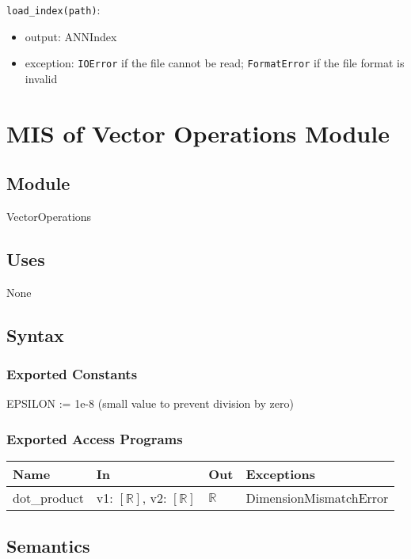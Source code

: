 \documentclass[12pt, titlepage]{article}
\begin{document}
\noindent \texttt{load\_index(path)}:
\begin{itemize}
  \item output: ANNIndex
  \item exception: \texttt{IOError} if the file cannot be read; \texttt{FormatError} if the file format is invalid
\end{itemize}

\newpage

\section{MIS of Vector Operations Module} \label{ModuleVO}

\subsection{Module}

VectorOperations

\subsection{Uses}
None

\subsection{Syntax}

\subsubsection{Exported Constants}
EPSILON := 1e-8 (small value to prevent division by zero)
\subsubsection{Exported Access Programs}

\begin{center}
\begin{tabular}{p{2cm} p{4cm} p{4cm} p{4cm}}
\hline
\textbf{Name} & \textbf{In} & \textbf{Out} & \textbf{Exceptions} \\
\hline
dot\_product & v1: $[\mathbb{R}]$, v2: $[\mathbb{R}]$ & $\mathbb{R}$ & DimensionMismatchError \\

\hline
\end{tabular}
\end{center}

\subsection{Semantics}
\end{document}
